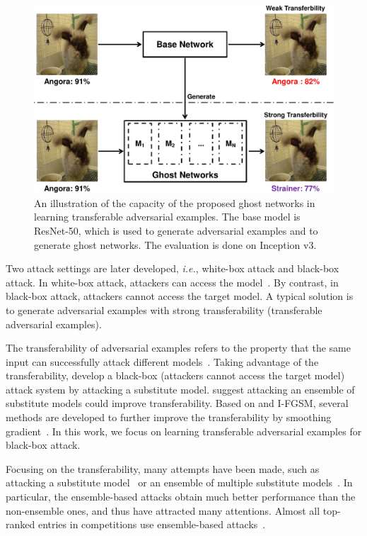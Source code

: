 \documentclass[letterpaper]{article} %
\def\ie{\emph{i.e.}}
\begin{document}
\begin{figure}[tb]
\begin{center}
\includegraphics[width=0.95\linewidth]{transferability-crop.pdf}
\end{center}
\caption{An illustration of the capacity of the proposed ghost networks in learning transferable adversarial examples. The base model is ResNet-50, which is used to generate adversarial examples and to generate ghost networks. The evaluation is done on Inception v3.}
\label{fig:ill_trans}
\end{figure}


Two attack settings are later developed, \ie, white-box attack and black-box attack.
In white-box attack, attackers can access the model~\cite{carlini2016towards,kurakin2016adversarial}.
By contrast, in black-box attack,
attackers cannot access the target model. A typical solution is to generate adversarial examples with strong transferability (transferable adversarial examples).

The transferability of adversarial examples refers to the property that the same input can successfully attack different models~\cite{szegedy2013intriguing}. Taking advantage of the transferability, \cite{papernot2016transferability} develop a black-box (attackers cannot access the target model) attack system by attacking a substitute model. \cite{liu2016delving} suggest attacking an ensemble of substitute models could improve transferability. Based on \cite{liu2016delving} and I-FGSM, several methods are developed to further improve the transferability by smoothing gradient~\cite{dong2017boosting,Zhou_2018_ECCV}. In this work, we focus on learning transferable adversarial examples for black-box attack.


Focusing on the transferability, many attempts have been made, such as attacking a substitute model~\cite{papernot2016transferability} or an ensemble of multiple substitute models~\cite{liu2016delving,dong2017boosting,Zhou_2018_ECCV}.
In particular, the ensemble-based attacks obtain much better performance than the non-ensemble ones, and thus have attracted many attentions.
Almost all top-ranked entries in competitions use ensemble-based attacks~\cite{kurakin2018adversarial}.
\end{document}
